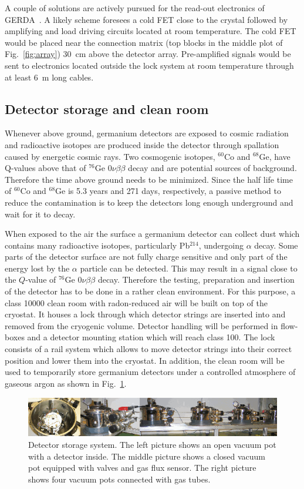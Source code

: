 A couple of solutions are actively pursued for the read-out electronics of GERDA~\cite{Cat07}. A likely scheme foresees a cold FET close to the crystal followed by amplifying and load driving circuits located at room temperature. The cold FET would be placed near the connection matrix (top blocks in the middle plot of Fig.~\ref{fig:array}) 30~cm above the detector array. Pre-amplified signals would be sent to electronics located outside the lock system at room temperature through at least 6~m long cables.

\subsection{Detector storage and clean room}
\label{sec:gerda:source}
Whenever above ground, germanium detectors are exposed to cosmic radiation and radioactive isotopes are produced inside the detector through spallation caused by energetic cosmic rays. Two cosmogenic isotopes, $^{60}$Co and $^{68}$Ge, have Q-values above that of $^{76}$Ge $0\nu\beta\beta$ decay and are potential sources of background. Therefore the time above ground needs to be minimized. Since the half life time of $^{60}$Co and $^{68}$Ge is 5.3 years and 271 days, respectively, a passive method to reduce the contamination is to keep the detectors long enough underground and wait for it to decay.

When exposed to the air the surface a germanium detector can collect dust which contains many radioactive isotopes, particularly Pb$^{214}$, undergoing $\alpha$ decay. Some parts of the detector surface are not fully charge sensitive and only part of the energy lost by the $\alpha$ particle can be detected. This may result in a signal close to the $Q$-value of $^{76}$Ge $0\nu\beta\beta$ decay. Therefore the testing, preparation and insertion of the detector has to be done in a rather clean environment. For this purpose, a class 10000 clean room with radon-reduced air will be built on top of the cryostat. It houses a lock through which detector strings are inserted into and removed from the cryogenic volume. Detector handling will be performed in flow-boxes and a detector mounting station which will reach class 100.  The lock consists of a rail system which allows to move detector strings into their correct position and lower them into the cryostat. In addition, the clean room will be used to temporarily store germanium detectors under a controlled atmosphere of gaseous argon as shown in Fig.~\ref{fig:store}.

\begin{figure}[tbhp]
  \centering
  \includegraphics[width=\textwidth]{storage}
  \caption{Detector storage system. The left picture shows an open     vacuum pot with a detector inside. The middle picture shows a     closed vacuum pot equipped with valves and gas flux sensor. The     right picture shows four vacuum pots connected with gas tubes.}
  \label{fig:store}
\end{figure}

